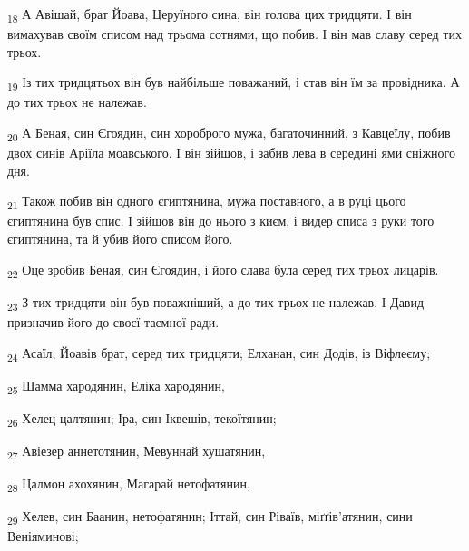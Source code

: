 \begin{tcolorbox}
\textsubscript{18} А Авішай, брат Йоава, Церуїного сина, він голова цих тридцяти. І він вимахував своїм списом над трьома сотнями, що побив. І він мав славу серед тих трьох.
\end{tcolorbox}
\begin{tcolorbox}
\textsubscript{19} Із тих тридцятьох він був найбільше поважаний, і став він їм за провідника. А до тих трьох не належав.
\end{tcolorbox}
\begin{tcolorbox}
\textsubscript{20} А Беная, син Єгоядин, син хороброго мужа, багаточинний, з Кавцеїлу, побив двох синів Аріїла моавського. І він зійшов, і забив лева в середині ями сніжного дня.
\end{tcolorbox}
\begin{tcolorbox}
\textsubscript{21} Також побив він одного єгиптянина, мужа поставного, а в руці цього єгиптянина був спис. І зійшов він до нього з києм, і видер списа з руки того єгиптянина, та й убив його списом його.
\end{tcolorbox}
\begin{tcolorbox}
\textsubscript{22} Оце зробив Беная, син Єгоядин, і його слава була серед тих трьох лицарів.
\end{tcolorbox}
\begin{tcolorbox}
\textsubscript{23} З тих тридцяти він був поважніший, а до тих трьох не належав. І Давид призначив його до своєї таємної ради.
\end{tcolorbox}
\begin{tcolorbox}
\textsubscript{24} Асаїл, Йоавів брат, серед тих тридцяти; Елханан, син Додів, із Віфлеєму;
\end{tcolorbox}
\begin{tcolorbox}
\textsubscript{25} Шамма хародянин, Еліка хародянин,
\end{tcolorbox}
\begin{tcolorbox}
\textsubscript{26} Хелец цалтянин; Іра, син Іквешів, текоїтянин;
\end{tcolorbox}
\begin{tcolorbox}
\textsubscript{27} Авіезер аннетотянин, Мевуннай хушатянин,
\end{tcolorbox}
\begin{tcolorbox}
\textsubscript{28} Цалмон ахохянин, Магарай нетофатянин,
\end{tcolorbox}
\begin{tcolorbox}
\textsubscript{29} Хелев, син Баанин, нетофатянин; Іттай, син Ріваїв, міґґів'атянин, сини Веніяминові;
\end{tcolorbox}

